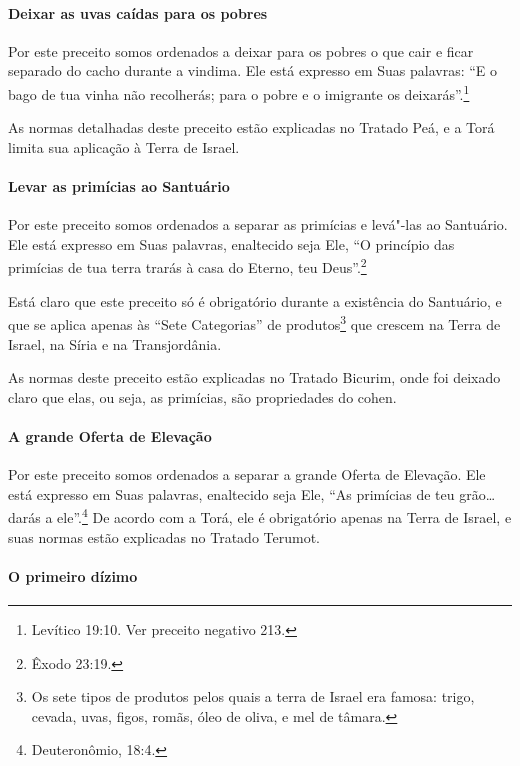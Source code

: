 \begin{multicols}{2}
\paragraph{Deixar as uvas caídas para os pobres}

Por este preceito somos ordenados a deixar para os pobres o que cair e
ficar separado do cacho durante a vindima. Ele está expresso em Suas
palavras: ``E o bago de tua vinha não recolherás; para o pobre e o
imigrante os deixarás''.\footnote{Levítico 19:10. Ver preceito negativo 213.}

As normas detalhadas deste preceito estão explicadas no Tratado Peá\starr, e a
Torá\starr{} limita sua aplicação à Terra de Israel.

\paragraph{Levar as primícias ao Santuário}

Por este preceito somos ordenados a separar as primícias e levá"-las ao
Santuário. Ele está expresso em Suas palavras, enaltecido seja Ele, ``O
princípio das primícias de tua terra trarás à casa do Eterno, teu
Deus''.\footnote{Êxodo 23:19.}

Está claro que este preceito só é obrigatório durante a existência do
Santuário, e que se aplica apenas às ``Sete Categorias'' de
produtos\footnote{Os sete tipos de produtos pelos quais a terra de Israel era famosa:
  trigo, cevada, uvas, figos, romãs, óleo de oliva, e mel de tâmara.} que crescem na Terra de Israel, na Síria
e na Transjordânia.

As normas deste preceito estão explicadas no Tratado Bicurim\starr, onde foi deixado claro que elas, ou seja, as primícias, são propriedades do cohen\starr.

\paragraph{A grande Oferta de Elevação}

Por este preceito somos ordenados a separar a grande Oferta de
Elevação. Ele está expresso em Suas palavras, enaltecido seja Ele, ``As
primícias de teu grão\ldots{} darás a ele''.\footnote{Deuteronômio, 18:4.} De acordo
com a Torá\starr, ele é obrigatório apenas na Terra de Israel, e suas normas
estão explicadas no Tratado Terumot\starr.

\paragraph{O primeiro dízimo}


\end{multicols}
